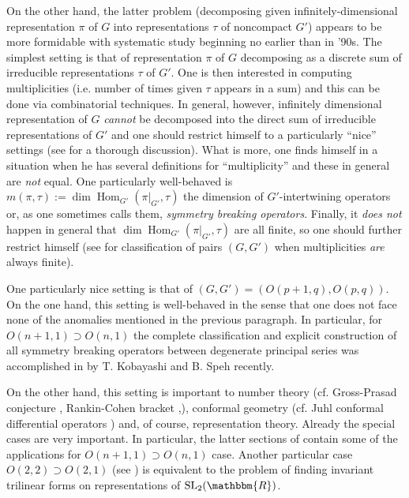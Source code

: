 \documentclass{article}
\newcommand{\assign}{:=}
\newcommand{\tmop}[1]{\ensuremath{\operatorname{#1}}}
\newcommand{\tmtextit}[1]{{\itshape{#1}}}
\numberwithin{definition}{section}
\numberwithin{lemma}{section}
\numberwithin{proposition}{section}
{\theorembodyfont{\rmfamily}\newtheorem{remark}{Remark}
\numberwithin{remark}{section}
}
\begin{document}
On the other hand, the latter problem (decomposing given
infinitely-dimensional representation $\pi$ of $G$ into representations $\tau$
of noncompact $G'$) appears to be more formidable with systematic study
beginning no earlier than in '90s. The simplest setting is that of
representation $\pi$ of $G$ decomposing as a discrete sum of irreducible
representations $\tau$ of $G'$. One is then interested in computing
multiplicities (i.e. number of times given $\tau$ appears in a sum) and this
can be done via combinatorial techniques. In general, however, infinitely
dimensional representation of $G$ \tmtextit{cannot} be decomposed into the
direct sum of irreducible representations of $G'$ and one should restrict
himself to a particularly ``nice'' settings (see {\cite{kobayashi2015program}}
for a thorough discussion). What is more, one finds himself in a situation
when he has several definitions for ``multiplicity'' and these in general are
\tmtextit{not} equal. One particularly well-behaved is $m ( \pi, \tau) \assign
\dim \tmop{Hom}_{G'} ( \pi |_{G'}, \tau)$ the dimension of $G'$-intertwining
operators or, as one sometimes calls them, \tmtextit{symmetry breaking
operators}. Finally, it \tmtextit{does not} happen in general that $\dim
\tmop{Hom}_{G'} ( \pi |_{G'}, \tau)$ are all finite, so one should further
restrict himself (see {\cite{kobayashi2014classification}} for classification
of pairs $( G, G')$ when multiplicities \tmtextit{are} always finite).

One particularly nice setting is that of $( G, G') = ( O ( p + 1, q), O ( p,
q))$. On the one hand, this setting is well-behaved in the sense that one does
not face none of the anomalies mentioned in the previous paragraph. In
particular, for $O ( n + 1, 1) \supset O ( n, 1)$ the complete classification
and explicit construction of all symmetry breaking operators between
degenerate principal series was accomplished in {\cite{kobayashi2015symmetry}}
by T. Kobayashi and B. Speh recently.

On the other hand, this setting is important to number theory (cf.
Gross-Prasad conjecture {\cite{gan2011symplectic}}, Rankin-Cohen bracket
{\cite{kobayashi2015differential1}},{\cite{kobayashi2015differential2}}),
conformal geometry (cf. Juhl conformal differential operators
{\cite{juhl2009families}}) and, of course, representation theory. Already the
special cases are very important. In particular, the latter sections of
{\cite{kobayashi2015symmetry}} contain some of the applications for $O ( n +
1, 1) \supset O ( n, 1)$ case. Another particular case $O ( 2, 2) \supset O (
2, 1)$ (see {\cite{clerc2011generalized}}) is equivalent to the problem of
finding invariant trilinear forms on representations of $\tmop{SL}_2 (
\mathbbm{R})$.
\end{document}
